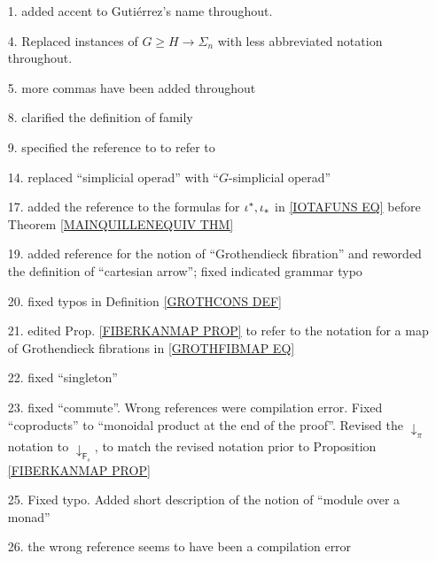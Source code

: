 \documentclass{article}
\begin{document}
\begin{itemize}
\item[1.] added accent to Guti\'{e}rrez's name throughout.

\item[4.] Replaced instances of $G \geq H \to \Sigma_n$ with less abbreviated notation throughout.

\item[5.] more commas have been added throughout

\item[8.] clarified the definition of family

\item[9.] specified the reference to 
\cite{Elm83}
to refer to
\cite[\S 3]{Elm83}

\item[14.] replaced ``simplicial operad'' with  ``$G$-simplicial operad''
      
\item[17.] 
added the reference to the formulas for 
$\iota^{\**},\iota_{\**}$
in \eqref{IOTAFUNS EQ} 
before Theorem \ref{MAINQUILLENEQUIV THM}

\item[19.] added reference for the notion of ``Grothendieck fibration'' and reworded the definition of ``cartesian arrow''; fixed indicated grammar typo

\item[20.] fixed typos in Definition \ref{GROTHCONS DEF}

\item[21.] edited Prop. \ref{FIBERKANMAP PROP} to refer to the notation for a map of Grothendieck fibrations in \eqref{GROTHFIBMAP EQ}

\item[22.] fixed ``singleton''

\item[23.] fixed ``commute''. Wrong references were compilation error.
Fixed ``coproducts'' to ``monoidal product at the end of the proof''. Revised the $\downarrow_{\pi}$ notation to 
$\downarrow_{\mathsf{F}_s}$, 
to match the revised notation prior to 
Proposition \ref{FIBERKANMAP PROP}


\item[25.] Fixed typo. Added short description of the notion of ``module over a monad'' 

\item[26.] the wrong reference seems to have been a compilation error


\end{itemize}
\end{document}
